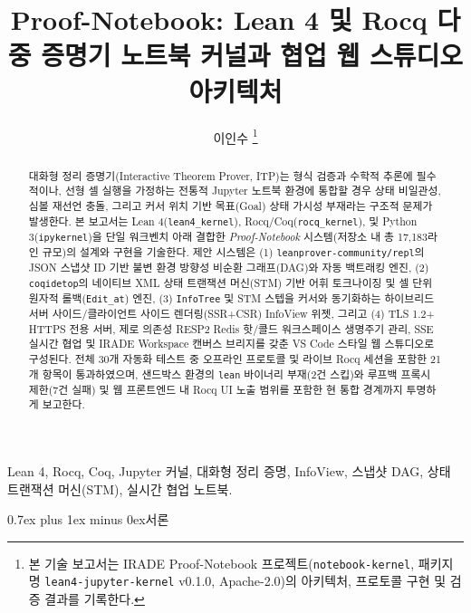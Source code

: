 \documentclass[journal]{IEEEtran}
\makeatletter
\def\section{\@startsection{section}{1}{\z@}{1.5ex plus 1.5ex minus 0.5ex}%
  {0.7ex plus 1ex minus 0ex}{\normalfont\normalsize\centering\bfseries}}%
\newcommand{\code}[1]{\texttt{#1}}
\makeatother
\begin{document}
\title{Proof-Notebook: Lean 4 및 Rocq 다중 증명기 노트북 커널과 협업 웹 스튜디오 아키텍처}

\author{이인수%
\thanks{본 기술 보고서는 IRADE Proof-Notebook 프로젝트(\code{notebook-kernel}, 패키지명 \code{lean4-jupyter-kernel} v0.1.0, Apache-2.0)의 아키텍처, 프로토콜 구현 및 검증 결과를 기록한다.}}


\maketitle

\begin{abstract}
대화형 정리 증명기(Interactive Theorem Prover, ITP)는 형식 검증과 수학적 추론에 필수적이나, 선형 셀 실행을 가정하는 전통적 Jupyter 노트북 환경에 통합할 경우 상태 비일관성, 심볼 재선언 충돌, 그리고 커서 위치 기반 목표(Goal) 상태 가시성 부재라는 구조적 문제가 발생한다. 본 보고서는 Lean 4(\code{lean4\_kernel}), Rocq/Coq(\code{rocq\_kernel}), 및 Python 3(\code{ipykernel})을 단일 워크벤치 아래 결합한 \textit{Proof-Notebook} 시스템(저장소 내 총 17,183라인 규모)의 설계와 구현을 기술한다. 제안 시스템은 (1) \code{leanprover-community/repl}의 JSON 스냅샷 ID 기반 불변 환경 방향성 비순환 그래프(DAG)와 자동 백트래킹 엔진, (2) \code{coqidetop}의 네이티브 XML 상태 트랜잭션 머신(STM) 기반 어휘 토크나이징 및 셀 단위 원자적 롤백(\code{Edit\_at}) 엔진, (3) \code{InfoTree} 및 STM 스텝을 커서와 동기화하는 하이브리드 서버 사이드/클라이언트 사이드 렌더링(SSR+CSR) InfoView 위젯, 그리고 (4) TLS 1.2+ HTTPS 전용 서버, 제로 의존성 RESP2 Redis 핫/콜드 워크스페이스 생명주기 관리, SSE 실시간 협업 및 IRADE Workspace 캔버스 브리지를 갖춘 VS Code 스타일 웹 스튜디오로 구성된다. 전체 30개 자동화 테스트 중 오프라인 프로토콜 및 라이브 Rocq 세션을 포함한 21개 항목이 통과하였으며, 샌드박스 환경의 \code{lean} 바이너리 부재(2건 스킵)와 루프백 프록시 제한(7건 실패) 및 웹 프론트엔드 내 Rocq UI 노출 범위를 포함한 현 통합 경계까지 투명하게 보고한다.
\end{abstract}

\begin{IEEEkeywords}
Lean 4, Rocq, Coq, Jupyter 커널, 대화형 정리 증명, InfoView, 스냅샷 DAG, 상태 트랜잭션 머신(STM), 실시간 협업 노트북.
\end{IEEEkeywords}

\section{서론}
\end{document}
